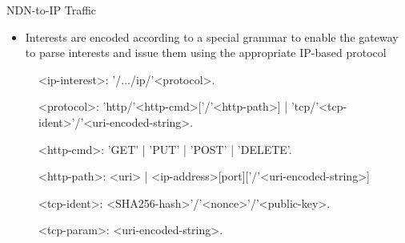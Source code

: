 \documentclass[handout]{beamer}
\begin{document}
\begin{frame}{NDN-to-IP Traffic}
\begin{itemize}
	\item Interests are encoded according to a special grammar to enable the gateway to parse interests and issue them using the appropriate IP-based protocol
\end{itemize}


\begin{figure}
\begin{mdframed}
\begingrammar
\noindent
<ip-interest>:	'/$\dots$/ip/'<protocol>.

<protocol>:	'http/'<http-cmd>[{'/'<http-path>}] | 'tcp/'<tcp-ident>'/'<uri-encoded-string>. 

<http-cmd>: 'GET' | 'PUT' | 'POST' | 'DELETE'.


<http-path>: <uri> | <ip-address>[port]['/'<uri-encoded-string>]

<tcp-ident>: <SHA256-hash>'/'<nonce>'/'<public-key>. %

<tcp-param>: <uri-encoded-string>.




		
\endgrammar
\end{mdframed}
\end{figure}

\end{frame}
\end{document}
